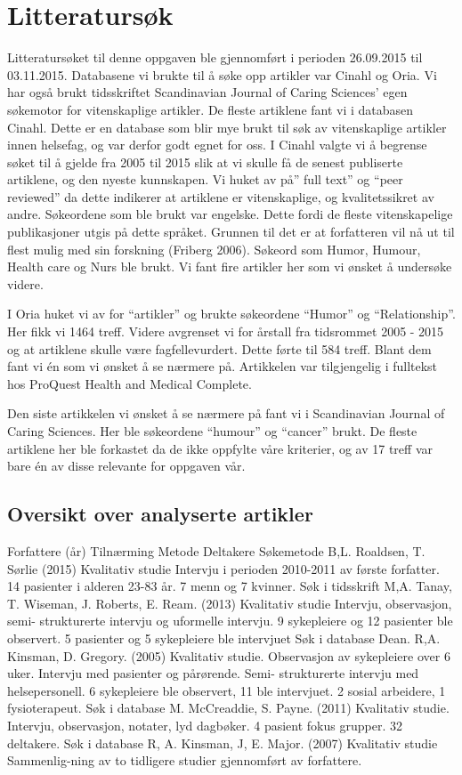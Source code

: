\section{Litteratursøk}

Litteratursøket til denne oppgaven ble gjennomført i perioden 26.09.2015 til
03.11.2015. Databasene vi brukte til å søke opp artikler var Cinahl og Oria. Vi
har også brukt tidsskriftet Scandinavian Journal of Caring Sciences’ egen
søkemotor for vitenskaplige artikler. De fleste artiklene fant vi i databasen
Cinahl. Dette er en database som blir mye brukt til søk av vitenskaplige
artikler innen helsefag, og var derfor godt egnet for oss.  I Cinahl valgte vi
å begrense søket til å gjelde fra 2005 til 2015 slik at vi skulle få de senest
publiserte artiklene, og den nyeste kunnskapen. Vi huket av på” full text” og
“peer reviewed” da dette indikerer at artiklene er vitenskaplige, og
kvalitetssikret av andre. Søkeordene som ble brukt var engelske. Dette fordi de
fleste vitenskapelige publikasjoner utgis på dette språket. Grunnen til det er
at forfatteren vil nå ut til flest mulig med sin forskning (Friberg 2006).
Søkeord som Humor, Humour, Health care og Nurs ble brukt. Vi fant fire artikler
her som vi ønsket å undersøke videre. 

I Oria huket vi av for “artikler” og brukte søkeordene “Humor” og
“Relationship”. Her fikk vi 1464 treff. Videre avgrenset vi for årstall fra
tidsrommet 2005 - 2015 og at artiklene skulle være fagfellevurdert.  Dette
førte til 584 treff. Blant dem fant vi én som vi ønsket å se nærmere på.
Artikkelen var tilgjengelig i fulltekst hos ProQuest Health and Medical
Complete.

Den siste artikkelen vi ønsket å se nærmere på fant vi i Scandinavian Journal
of Caring Sciences. Her ble søkeordene “humour” og “cancer” brukt. De fleste
artiklene her ble forkastet da de ikke oppfylte våre kriterier, og av 17 treff
var bare én av disse relevante for oppgaven vår.


\subsection{Oversikt over analyserte artikler }

Forfattere (år)
	Tilnærming
	Metode
	Deltakere
	Søkemetode
	B,L. Roaldsen, T. Sørlie
(2015)
	Kvalitativ studie
	Intervju i perioden 2010-2011 av første forfatter.
	14 pasienter i alderen 23-83 år. 
7 menn og 7 kvinner.
	Søk i tidsskrift
	M,A. Tanay, T. Wiseman, J. Roberts, E. Ream. (2013)
	Kvalitativ studie
	Intervju, observasjon, semi-
strukturerte intervju og uformelle intervju.
	9 sykepleiere og 12 pasienter ble observert. 
5 pasienter og 5 sykepleiere ble intervjuet
	Søk i database
	Dean. R,A. Kinsman, D. Gregory. (2005)
	Kvalitativ studie.
	Observasjon av sykepleiere over 6 uker. Intervju med pasienter og pårørende. Semi-
strukturerte intervju med helsepersonell.
	6 sykepleiere ble observert, 11 ble intervjuet. 2 sosial arbeidere, 1 fysioterapeut.
	Søk i database
	M. McCreaddie, S. Payne. (2011)
	Kvalitativ studie.
	Intervju, observasjon, notater, lyd dagbøker.
	4 pasient fokus grupper. 
32 deltakere.
	Søk i database
	R, A. Kinsman, J, E. Major. (2007)
	Kvalitativ studie
	Sammenlig-ning av to tidligere studier gjennomført av forfattere.

